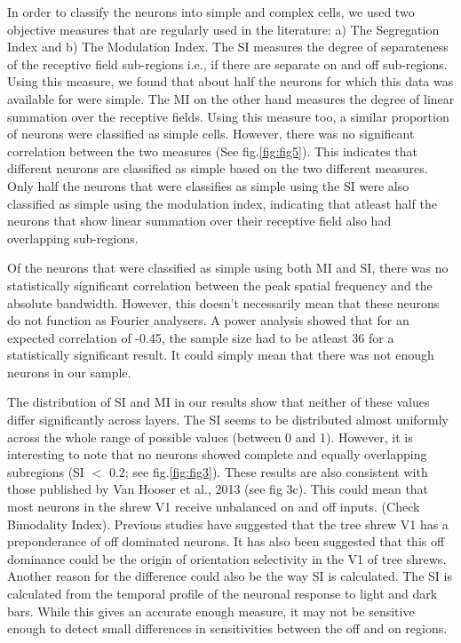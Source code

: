 	In order to classify the neurons into simple and complex cells, we used two objective measures that are regularly used in the literature: a) The Segregation Index and b) The Modulation Index. The SI measures the degree of separateness of the receptive field sub-regions i.e., if there are separate on and off sub-regions. Using this measure, we found that about half the neurons for which this data was available for were simple. The MI on the other hand measures the degree of linear summation over the receptive fields. Using this measure too, a similar proportion of  neurons were classified as simple cells. However, there was no significant correlation between the two measures (See fig.\ref{fig:fig5}). This indicates that different neurons are classified as simple based on the two different measures. Only half the neurons that were classifies as simple using the SI were also classified as simple using the modulation index, indicating that atleast half the neurons that show linear summation over their receptive field also had overlapping sub-regions. 
	
	Of the neurons that were classified as simple using both MI and SI, there was no statistically significant correlation between the peak spatial frequency and the absolute bandwidth. However, this doesn't necessarily mean that these neurons do not function as Fourier analysers. A power analysis showed that for an expected correlation of -0.45, the sample size had to be atleast 36 for a statistically significant result. It could simply mean that there was not enough neurons in our sample.
	
	The distribution of SI and MI in our results show that neither of these values differ significantly across layers. The SI seems to be distributed almost uniformly across the whole range of possible values (between 0 and 1). However, it is interesting to note that no neurons showed complete and equally overlapping subregions (SI $<$ 0.2; see fig.\ref{fig:fig3}). These results are also consistent with those published by Van Hooser et al., 2013 (see fig 3c). This could mean that most neurons in the shrew V1 receive unbalanced on and off inputs. (Check Bimodality Index). Previous studies have suggested that the tree shrew V1 has a preponderance of off dominated neurons. It has also been suggested that this off dominance could be the origin of orientation selectivity in the V1 of tree shrews. Another reason for the difference could also be the way SI is calculated. The SI is calculated from the temporal profile of the neuronal response to light and dark bars. While this gives an accurate enough measure, it may not be sensitive enough to detect small differences in sensitivities between the off and on regions.
	
